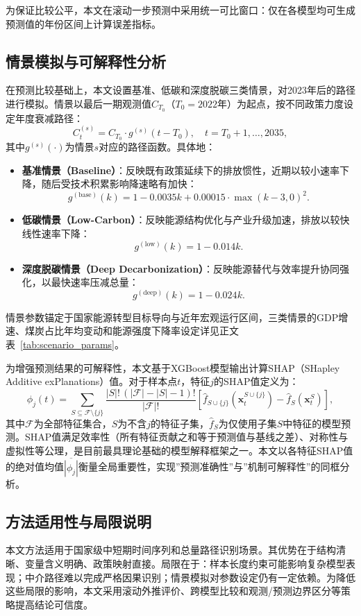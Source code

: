 为保证比较公平，本文在滚动一步预测中采用统一可比窗口：仅在各模型均可生成预测值的年份区间上计算误差指标。

\subsection{情景模拟与可解释性分析}
在预测比较基础上，本文设置基准、低碳和深度脱碳三类情景，对2023年后的路径进行模拟。情景以最后一期观测值$C_{T_0}$（$T_0=2022$年）为起点，按不同政策力度设定年度衰减路径：
\begin{equation}
C_t^{(s)} = C_{T_0} \cdot g^{(s)}(t - T_0), \quad t = T_0+1,\ldots,2035,
\end{equation}
其中$g^{(s)}(\cdot)$为情景$s$对应的路径函数。具体地：

\begin{itemize}
  \item {\songti\bfseries{}基准情景（Baseline）}：反映既有政策延续下的排放惯性，近期以较小速率下降，随后受技术积累影响降速略有加快：
  \begin{equation}
  g^{(\mathrm{base})}(k) = 1 - 0.0035k + 0.00015\cdot\max(k-3,0)^2.
  \end{equation}
  \item {\songti\bfseries{}低碳情景（Low-Carbon）}：反映能源结构优化与产业升级加速，排放以较快线性速率下降：
  \begin{equation}
  g^{(\mathrm{low})}(k) = 1 - 0.014k.
  \end{equation}
  \item {\songti\bfseries{}深度脱碳情景（Deep Decarbonization）}：反映能源替代与效率提升协同强化，以最快速率压减总量：
  \begin{equation}
  g^{(\mathrm{deep})}(k) = 1 - 0.024k.
  \end{equation}
\end{itemize}

情景参数锚定于国家能源转型目标导向与近年宏观运行区间，三类情景的GDP增速、煤炭占比年均变动和能源强度下降率设定详见正文表~\ref{tab:scenario_params}。

为增强预测结果的可解释性，本文基于XGBoost模型输出计算SHAP（SHapley Additive exPlanations）值。对于样本点$t$，特征$j$的SHAP值定义为：
\begin{equation}
\phi_j(t) = \sum_{S \subseteq \mathcal{F}\setminus\{j\}} \frac{|S|!\,(|\mathcal{F}|-|S|-1)!}{|\mathcal{F}|!}
\left[\hat{f}_{S\cup\{j\}}(\mathbf{x}_t^{S\cup\{j\}}) - \hat{f}_S(\mathbf{x}_t^S)\right],
\end{equation}
其中$\mathcal{F}$为全部特征集合，$S$为不含$j$的特征子集，$\hat{f}_S$为仅使用子集$S$中特征的模型预测。SHAP值满足效率性（所有特征贡献之和等于预测值与基线之差）、对称性与虚拟性等公理，是目前最具理论基础的模型解释框架之一。本文以各特征SHAP值的绝对值均值$\overline{|\phi_j|}$衡量全局重要性，实现”预测准确性”与”机制可解释性”的同框分析。

\subsection{方法适用性与局限说明}
本文方法适用于国家级中短期时间序列和总量路径识别场景。其优势在于结构清晰、变量含义明确、政策映射直接。局限在于：样本长度约束可能影响复杂模型表现；中介路径难以完成严格因果识别；情景模拟对参数设定仍有一定依赖。为降低这些局限的影响，本文采用滚动外推评价、跨模型比较和观测/预测边界区分等策略提高结论可信度。
